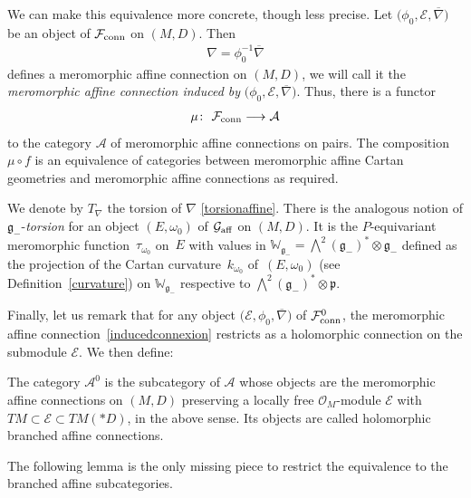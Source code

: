 \documentclass[pdftex]{sigma}
\numberwithin{equation}{section}
\begin{document}
We can make this equivalence more concrete, though less precise. Let $\big(\phi_0,\mathcal{E},\overline{\nabla}\big)$ be an object of $\mathcal{F}_{\rm conn}$ on $(M,D)$. Then \begin{gather}\label{inducedconnexion} \nabla = \phi_0^{-1} \overline{\nabla} \end{gather}
defines a meromorphic affine connection on $(M,D)$, we will call it the \textit{meromorphic affine connection induced by} $\big(\phi_0,\mathcal{E},\overline{\nabla}\big)$. Thus, there is a functor \begin{gather}\label{fonctmu} \mu\colon\ \mathcal{F}_{\rm conn} \longrightarrow \mathcal{A} \end{gather} to the category $\mathcal{A}$ of meromorphic affine connections on pairs. The composition $\mu\circ f$ is an equivalence of categories between meromorphic affine Cartan geometries and meromorphic affine connections as required.

We denote by $T_\nabla$ the torsion of $\nabla$ \eqref{torsionaffine}. There is the analogous notion of $\mathfrak{g}_-$-\textit{torsion} for an object $(E,\omega_0)$ of $\mathcal{G}_{\rm aff}$ on $(M,D)$. It is the $P$-equivariant meromorphic function~$\tau_{\omega_0}$ on~$E$ with values in $\mathbb{W}_{\mathfrak{g}_-} = \bigwedge^{2} (\mathfrak{g}_-)^* \otimes \mathfrak{g}_-$ defined as the projection of the Cartan curvature~$k_{\omega_0}$ of~$(E,\omega_0)$ (see Definition~\ref{curvature}) on $\mathbb{W}_{\mathfrak{g}_-}$ respective to $\bigwedge^{2} (\mathfrak{g}_-)^* \otimes \mathfrak{p}$.

 Finally, let us remark that for any object $\big(\mathcal{E},\phi_0,\overline{\nabla}\big)$ of $\mathcal{F}_{\rm conn}^0$, the meromorphic affine connection~\eqref{inducedconnexion} restricts as a holomorphic connection on the submodule $\mathcal{E}$. We then define: \begin{Definition}\label{branchedaffine} The category $\mathcal{A}^0$ is the subcategory of $\mathcal{A}$ whose objects are the meromorphic affine connections on $(M,D)$ preserving a locally free $\mathcal{O}_M$-module $\mathcal{E}$ with $TM\subset \mathcal{E}\subset TM(* D)$, in the above sense. Its objects 	are called holomorphic branched affine connections. \end{Definition}

 The following lemma is the only missing piece to restrict the equivalence to the branched affine subcategories.
\end{document}
